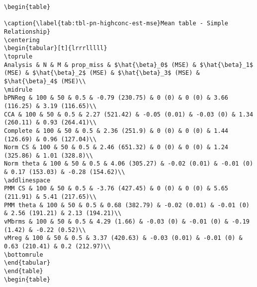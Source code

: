 \documentclass[
]{article}
\begin{document}
\begin{table}

\caption{\textbf{?(caption)}}\begin{minipage}[t]{\linewidth}

{\centering 

\begin{verbatim}
\begin{table}

\caption{\label{tab:tbl-pn-highconc-est-mse}Mean table - Simple Relationship}
\centering
\begin{tabular}[t]{lrrrlllll}
\toprule
Analysis & N & M & prop_miss & $\hat{\beta}_0$ (MSE) & $\hat{\beta}_1$ (MSE) & $\hat{\beta}_2$ (MSE) & $\hat{\beta}_3$ (MSE) & $\hat{\beta}_4$ (MSE)\\
\midrule
bPNReg & 100 & 50 & 0.5 & -0.79 (230.75) & 0 (0) & 0 (0) & 3.66 (116.25) & 3.19 (116.65)\\
CCA & 100 & 50 & 0.5 & 2.27 (521.42) & -0.05 (0.01) & -0.03 (0) & 1.34 (260.11) & 0.93 (264.41)\\
Complete & 100 & 50 & 0.5 & 2.36 (251.9) & 0 (0) & 0 (0) & 1.44 (126.69) & 0.96 (127.04)\\
Norm CS & 100 & 50 & 0.5 & 2.46 (651.32) & 0 (0) & 0 (0) & 1.24 (325.86) & 1.01 (328.8)\\
Norm theta & 100 & 50 & 0.5 & 4.06 (305.27) & -0.02 (0.01) & -0.01 (0) & 0.17 (153.03) & -0.28 (154.62)\\
\addlinespace
PMM CS & 100 & 50 & 0.5 & -3.76 (427.45) & 0 (0) & 0 (0) & 5.65 (211.91) & 5.41 (217.65)\\
PMM theta & 100 & 50 & 0.5 & 0.68 (382.79) & -0.02 (0.01) & -0.01 (0) & 2.56 (191.21) & 2.13 (194.21)\\
vMbrms & 100 & 50 & 0.5 & 4.29 (1.66) & -0.03 (0) & -0.01 (0) & -0.19 (1.42) & -0.22 (0.52)\\
vMreg & 100 & 50 & 0.5 & 3.37 (420.63) & -0.03 (0.01) & -0.01 (0) & 0.63 (210.41) & 0.2 (212.97)\\
\bottomrule
\end{tabular}
\end{table}
\begin{table}


\end{verbatim}}
\end{minipage}
\end{table}
\end{document}
